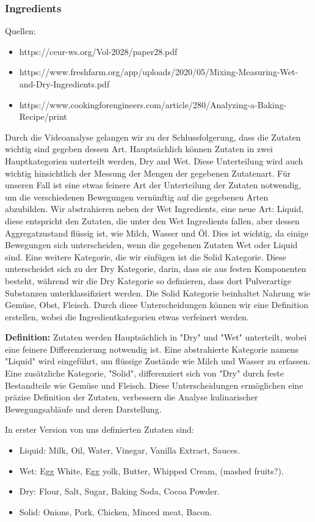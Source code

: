 \subsubsection*{Ingredients}
Quellen:
\begin{itemize}
  \item https://ceur-ws.org/Vol-2028/paper28.pdf
  \item https://www.freshfarm.org/app/uploads/2020/05/Mixing-Measuring-Wet-and-Dry-Ingredients.pdf
  \item https://www.cookingforengineers.com/article/280/Analyzing-a-Baking-Recipe/print
\end{itemize}
Durch die Videoanalyse gelangen wir zu der Schlussfolgerung, dass die Zutaten wichtig sind gegeben dessen Art. 
Hauptsächlich können Zutaten in zwei Hauptkategorien unterteilt werden, Dry and Wet. Diese Unterteilung wird auch wichtig hinsichtlich der Messung der Mengen der gegebenen Zutatenart. 
Für unseren Fall ist eine etwas feinere Art der Unterteilung der Zutaten notwendig, um die verschiedenen Bewegungen vernünftig auf die gegebenen Arten abzubilden.
Wir abstrahieren neben der Wet Ingredients, eine neue Art: Liquid, diese entspricht den Zutaten, die unter den Wet Ingredients fallen, aber dessen Aggregatzustand flüssig ist, wie Milch, Wasser und Öl.
Dies ist wichtig, da einige Bewegungen sich unterscheiden, wenn die gegebenen Zutaten Wet oder Liquid sind.
Eine weitere Kategorie, die wir einfügen ist die Solid Kategorie. Diese unterscheidet sich zu der Dry Kategorie, darin, dass sie aus festen Komponenten besteht, während wir die Dry Kategorie so definieren, dass dort Pulverartige Substanzen unterklassifiziert werden.
Die Solid Kategorie beinhaltet Nahrung wie Gemüse, Obst, Fleisch.
Durch diese Unterscheidungen können wir eine Definition erstellen, wobei die Ingredientkategorien etwas verfeinert werden.

\textbf{Definition:}
Zutaten werden Hauptsächlich in "Dry" und "Wet" unterteilt, wobei eine feinere Differenzierung notwendig ist. Eine abstrahierte Kategorie namens "Liquid" wird eingeführt, um flüssige Zustände wie Milch und Wasser zu erfassen. Eine zusätzliche Kategorie, "Solid", differenziert sich von "Dry" durch feste Bestandteile wie Gemüse und Fleisch. Diese Unterscheidungen ermöglichen eine präzise Definition der Zutaten, verbessern die Analyse kulinarischer Bewegungsabläufe und deren Darstellung.

In erster Version von uns definierten Zutaten sind:
\begin{itemize}
  \item Liquid: Milk, Oil, Water, Vinegar, Vanilla Extract, Sauces.
  \item Wet: Egg White, Egg yolk, Butter, Whipped Cream, (mashed fruits?).
  \item Dry: Flour, Salt, Sugar, Baking Soda, Cocoa Powder.
  \item Solid: Onions, Pork, Chicken, Minced meat, Bacon.
\end{itemize}

